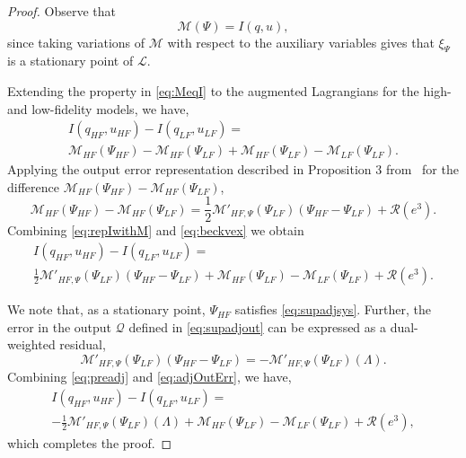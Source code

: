 \begin{proof}
%
Observe that
%
\begin{equation}
\label{eq:MeqI}
\mathcal{M}(\Psi)=I(q,u),
\end{equation}
%
since taking variations of $\mathcal{M}$ with respect to the auxiliary variables gives that $\xi_\Psi$ is a stationary point of $\mathcal{L}$.

Extending the property in \cref{eq:MeqI} to the augmented Lagrangians for the high- and low-fidelity models, we have,
%
\begin{multline}
\label{eq:repIwithM}
I(q_{HF},u_{HF})-I(q_{LF},u_{LF})=\\\mathcal{M}_{HF}(\Psi_{HF})-\mathcal{M}_{HF}(\Psi_{LF})+\mathcal{M}_{HF}(\Psi_{LF})-\mathcal{M}_{LF}(\Psi_{LF})\textrm{.}
\end{multline}
%
Applying the output error representation described in Proposition 3 from~\cite{BecVex05} for the difference $\mathcal{M}_{HF}(\Psi_{HF})-\mathcal{M}_{HF}(\Psi_{LF})$,
\begin{equation}
\label{eq:beckvex}
\mathcal{M}_{HF}(\Psi_{HF})-\mathcal{M}_{HF}(\Psi_{LF}) = \frac{1}{2}\mathcal{M}'_{HF,\Psi}(\Psi_{LF})(\Psi_{HF}-\Psi_{LF})+\mathcal{R}(e^3)\textrm{.}
\end{equation}
Combining \cref{eq:repIwithM} and \cref{eq:beckvex} we obtain
\begin{multline}
\label{eq:preadj}
I(q_{HF},u_{HF})-I(q_{LF},u_{LF})=\\\frac{1}{2}\mathcal{M}'_{HF,\Psi}(\Psi_{LF})(\Psi_{HF}-\Psi_{LF})+\mathcal{M}_{HF}(\Psi_{LF})-\mathcal{M}_{LF}(\Psi_{LF})+\mathcal{R}(e^3)\textrm{.}
\end{multline}

We note that, as a stationary point, $\Psi_{HF}$ satisfies \cref{eq:supadjsys}. Further, the error in the output $\mathcal{Q}$ defined in \cref{eq:supadjout} can be expressed as a dual-weighted residual,
\begin{equation}
\label{eq:adjOutErr}
\mathcal M'_{HF,\Psi}(\Psi_{LF})(\Psi_{HF}-\Psi_{LF})=-\mathcal{M}'_{HF,\Psi}(\Psi_{LF})(\Lambda).
\end{equation}
%
Combining \cref{eq:preadj} and \cref{eq:adjOutErr}, we have,
\begin{multline}
I(q_{HF},u_{HF})-I(q_{LF},u_{LF})=\\-\frac{1}{2}\mathcal{M}'_{HF,\Psi}(\Psi_{LF})(\Lambda)+\mathcal M_{HF}(\Psi_{LF})-\mathcal M_{LF}(\Psi_{LF})+\mathcal{R}(e^3), \nonumber
\end{multline}
%
which completes the proof.
\end{proof}
%
